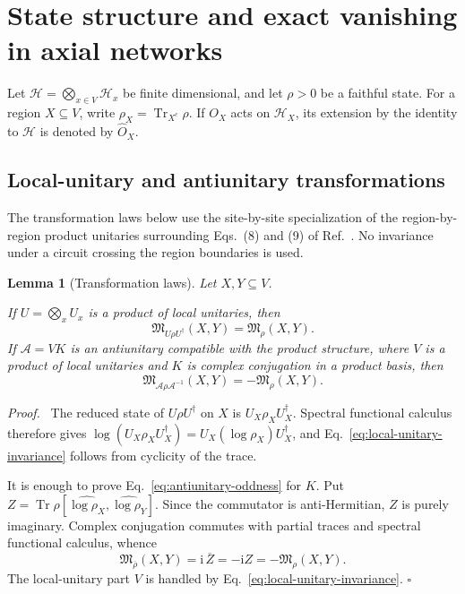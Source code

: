 \documentclass[11pt]{article}
\newcommand{\Tr}{\operatorname{Tr}}
\newcommand{\Mmod}{\mathfrak{M}}
\newcommand{\ii}{\mathrm{i}}
\newtheorem{lemma}[theorem]{Lemma}
\newenvironment{proof}{\par\noindent\textit{Proof.}\ }%
{\unskip\nobreak\hfill\(\square\)\par}
\begin{document}
\section{State structure and exact vanishing in axial networks}
\label{sec:state-functional}

Let
\(
\mathcal H=\bigotimes_{x\in V}\mathcal H_x
\)
be finite dimensional, and let $\rho>0$ be a faithful state.  For a region
$X\subseteq V$, write $\rho_X=\Tr_{X^c}\rho$.  If $O_X$ acts on
$\mathcal H_X$, its extension by the identity to $\mathcal H$ is denoted by
$\widehat O_X$.

\subsection{Local-unitary and antiunitary transformations}

The transformation laws below use the site-by-site specialization of the
region-by-region product unitaries surrounding Eqs.~(8) and (9) of
Ref.~\cite{KimEtAl2022PRB}.  No invariance under a circuit crossing the
region boundaries is used.

\begin{lemma}[Transformation laws]
\label{lem:symmetries}
Let $X,Y\subseteq V$.

If $U=\bigotimes_xU_x$ is a product of local unitaries, then
\begin{equation}
 \Mmod_{U\rho U^\dagger}(X,Y)=\Mmod_\rho(X,Y).
 \label{eq:local-unitary-invariance}
\end{equation}
If $\mathcal A=VK$ is an antiunitary compatible with the product structure,
where $V$ is a product of local unitaries and $K$ is complex conjugation in a
product basis, then
\begin{equation}
 \Mmod_{\mathcal A\rho\mathcal A^{-1}}(X,Y)
 =-\Mmod_\rho(X,Y).
 \label{eq:antiunitary-oddness}
\end{equation}
\end{lemma}

\begin{proof}
The reduced state of $U\rho U^\dagger$ on $X$ is
$U_X\rho_XU_X^\dagger$.  Spectral functional calculus therefore gives
\(
\log(U_X\rho_XU_X^\dagger)=U_X(\log\rho_X)U_X^\dagger
\),
and Eq.~\eqref{eq:local-unitary-invariance} follows from cyclicity of the
trace.

It is enough to prove Eq.~\eqref{eq:antiunitary-oddness} for $K$.  Put
$Z=\Tr\rho[\widehat{\log\rho_X},\widehat{\log\rho_Y}]$.  Since the
commutator is anti-Hermitian, $Z$ is purely imaginary.  Complex conjugation
commutes with partial traces and spectral functional calculus, whence
\begin{equation*}
 \Mmod_{\overline\rho}(X,Y)
 =\ii\,\overline{Z}=-\ii Z=-\Mmod_\rho(X,Y).
\end{equation*}
The local-unitary part $V$ is handled by
Eq.~\eqref{eq:local-unitary-invariance}.
\end{proof}
\end{document}
